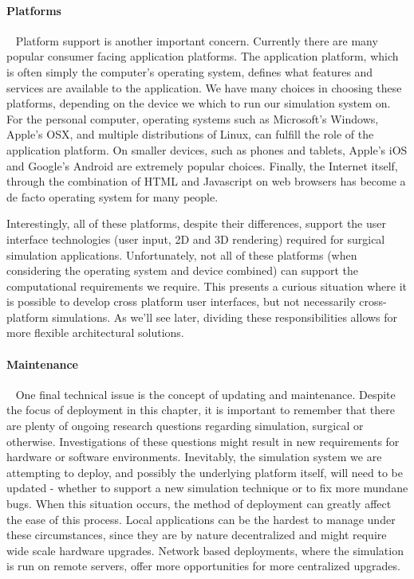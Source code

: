 \paragraph{Platforms}~ Platform support is another important
concern. Currently there are many popular consumer facing application
platforms. The application platform, which is often simply the
computer's operating system, defines what features and services are
available to the application. We have many choices in choosing these
platforms, depending on the device we which to run
our simulation system on. For the personal computer, operating systems such as
Microsoft's Windows, Apple's OSX, and multiple distributions of Linux,
can fulfill the role of the application platform. On smaller devices,
such as phones and tablets, Apple's iOS and Google's Android are
extremely popular choices. Finally, the Internet itself, through the
combination of HTML and Javascript on web browsers has become a de
facto operating system for many people.

Interestingly, all of these platforms, despite their differences,
support the user interface technologies (user input, 2D and 3D
rendering) required for surgical simulation
applications. Unfortunately, not all of these platforms (when
considering the operating system and device combined) can support the
computational requirements we require. This presents a curious
situation where it is possible to develop cross platform user
interfaces, but not necessarily cross-platform simulations. As we'll
see later, dividing these responsibilities allows for more flexible
architectural solutions.

\paragraph{Maintenance}~ One final technical issue is the concept of
updating and maintenance. Despite the focus of deployment in this
chapter, it is important to remember that there are plenty of ongoing
research questions regarding simulation, surgical or
otherwise. Investigations of these questions might result in new
requirements for hardware or software environments. Inevitably, the
simulation system we are attempting to deploy, and possibly the
underlying platform itself, will need to be updated - whether to support a
new simulation technique or to fix more mundane bugs. When this
situation occurs, the method of deployment can greatly affect the ease
of this process. Local applications can be the hardest to manage under
these circumstances, since they are by nature decentralized and might
require wide scale hardware upgrades. Network based deployments, where
the simulation is run on remote servers, offer more opportunities for
more centralized upgrades.

